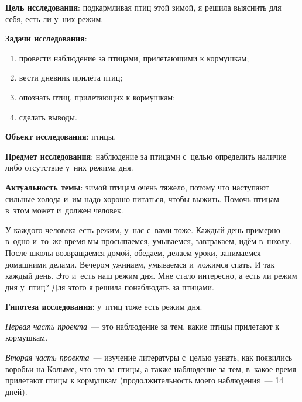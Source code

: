 


\makeProcTitleSchool



\textbf{Цель исследования}: подкармливая птиц этой зимой, я решила выяснить для себя, есть ли у~них режим.

\textbf{Задачи исследования}:
\begin{enumerate}[noitemsep]\vspace{-8pt}
\item провести наблюдение за птицами, прилетающими к кормушкам;
\item вести дневник прилёта птиц;
\item опознать птиц, прилетающих к кормушкам;
\item сделать выводы.
\end{enumerate}\vspace{-8pt}

\textbf{Объект исследования}: птицы.

\textbf{Предмет исследования}: наблюдение за птицами с~целью определить наличие либо отсутствие у~них режима дня.

\textbf{Актуальность темы}: зимой птицам очень тяжело, потому что наступают сильные холода и~им надо хорошо питаться, чтобы выжить. Помочь птицам в~этом может и~должен человек.

У каждого человека есть режим, у~нас с~вами тоже. Каждый день примерно в~одно и~то~же время мы просыпаемся, умываемся, завтракаем, идём в~школу. После школы возвращаемся домой, обедаем, делаем уроки, занимаемся домашними делами. Вечером ужинаем, умываемся и~ложимся спать. И так каждый день. Это и~есть наш режим дня. Мне стало интересно, а есть ли режим дня у~птиц? Для этого я решила понаблюдать за птицами.

\textbf{Гипотеза исследования}: у~птиц тоже есть режим дня.

\textit{Первая часть проекта}~--- это наблюдение за тем, какие птицы прилетают к кормушкам.

\textit{Вторая часть проекта}~--- изучение литературы с~целью узнать, как появились воробьи на Колыме, что это за птицы, а также наблюдение за тем, в~какое время прилетают птицы к кормушкам (продолжительность моего наблюдения~--- 14 дней).

